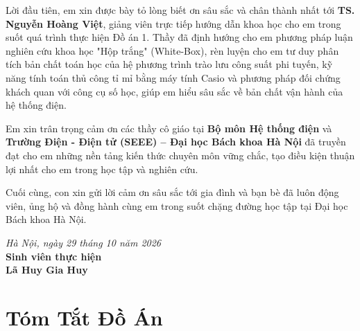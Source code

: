 \documentclass[12pt,a4paper,oneside]{report}
\begin{document}
Lời đầu tiên, em xin được bày tỏ lòng biết ơn sâu sắc và chân thành nhất tới \textbf{TS. Nguyễn Hoàng Việt}, giảng viên trực tiếp hướng dẫn khoa học cho em trong suốt quá trình thực hiện Đồ án 1. Thầy đã định hướng cho em phương pháp luận nghiên cứu khoa học "Hộp trắng" (White-Box), rèn luyện cho em tư duy phân tích bản chất toán học của hệ phương trình trào lưu công suất phi tuyến, kỹ năng tính toán thủ công tỉ mỉ bằng máy tính Casio và phương pháp đối chứng khách quan với công cụ số học, giúp em hiểu sâu sắc về bản chất vận hành của hệ thống điện.

Em xin trân trọng cảm ơn các thầy cô giáo tại \textbf{Bộ môn Hệ thống điện} và \textbf{Trường Điện - Điện tử (SEEE) -- Đại học Bách khoa Hà Nội} đã truyền đạt cho em những nền tảng kiến thức chuyên môn vững chắc, tạo điều kiện thuận lợi nhất cho em trong học tập và nghiên cứu.

Cuối cùng, con xin gửi lời cảm ơn sâu sắc tới gia đình và bạn bè đã luôn động viên, ủng hộ và đồng hành cùng em trong suốt chặng đường học tập tại Đại học Bách khoa Hà Nội.

\vspace{1.5cm}
\begin{flushright}
    \textit{Hà Nội, ngày 29 tháng 10 năm 2026}\\[5pt]
    \textbf{Sinh viên thực hiện}\\[30pt]
    \textbf{Lã Huy Gia Huy}
\end{flushright}

\newpage

\chapter*{Tóm Tắt Đồ Án}
\end{document}
